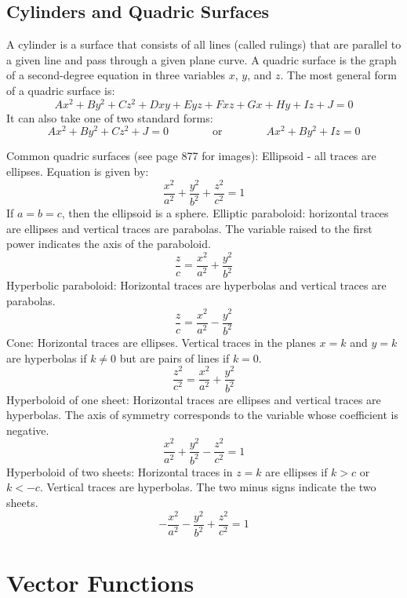 \documentclass{article}
\begin{document}
    \subsection{Cylinders and Quadric Surfaces}
    \begin{outline}
        \1 A cylinder is a surface that consists of all lines (called rulings) that are parallel to a given line and pass through a given plane curve. 
        \1 A quadric surface is the graph of a second-degree equation in three variables \(x\), \(y\), and \(z\). The most general form of a quadric surface is: \[Ax^2+By^2+Cz^2+Dxy+Eyz+Fxz+Gx+Hy+Iz+J=0\]
        \1 It can also take one of two standard forms: \[Ax^2+By^2+Cz^2+J=0\qquad\qquad\text{or}\qquad\qquad Ax^2+By^2+Iz=0\]

    \end{outline}\begin{multicols}{2}\begin{outline}

    \0 Common quadric surfaces (see page 877 for images): 
        \1 Ellipsoid - all traces are ellipses. Equation is given by: \[\dfrac{x^2}{a^2}+\dfrac{y^2}{b^2}+\dfrac{z^2}{c^2}=1\] If \(a=b=c\), then the ellipsoid is a sphere. 
        \1 Elliptic paraboloid: horizontal traces are ellipses and vertical traces are parabolas. The variable raised to the first power indicates the axis of the paraboloid. \[\dfrac{z}{c}=\dfrac{x^2}{a^2}+\dfrac{y^2}{b^2}\]
        \1 Hyperbolic paraboloid: Horizontal traces are hyperbolas and vertical traces are parabolas. \[\dfrac{z}{c}=\dfrac{x^2}{a^2}-\dfrac{y^2}{b^2}\]
        \1 Cone: Horizontal traces are ellipses. Vertical traces in the planes \(x=k\) and \(y=k\) are hyperbolas if \(k\neq 0\) but are pairs of lines if \(k=0\). \[\dfrac{z^2}{c^2}=\dfrac{x^2}{a^2}+\dfrac{y^2}{b^2}\]
        \1 Hyperboloid of one sheet: Horizontal traces are ellipses and vertical traces are hyperbolas. The axis of symmetry corresponds to the variable whose coefficient is negative. \[\dfrac{x^2}{a^2}+\dfrac{y^2}{b^2}-\dfrac{z^2}{c^2}=1\]
        \1 Hyperboloid of two sheets: Horizontal traces in \(z=k\) are ellipses if \(k>c\) or \(k<-c\). Vertical traces are hyperbolas. The two minus signs indicate the two sheets. \[-\dfrac{x^2}{a^2}-\dfrac{y^2}{b^2}+\dfrac{z^2}{c^2}=1\]
        
    \end{outline}
\end{multicols}
    \section{Vector Functions} %
\end{document}
